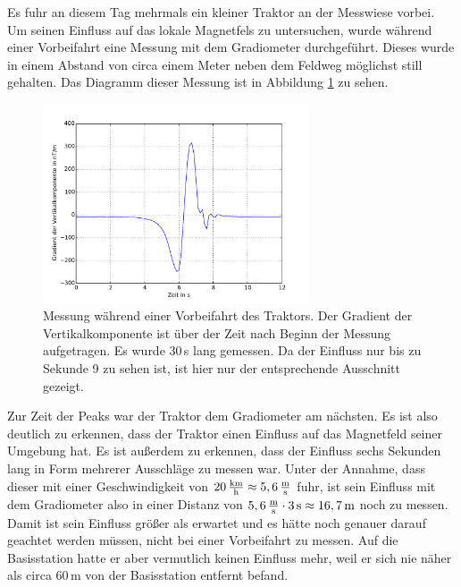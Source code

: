 Es fuhr an diesem Tag mehrmals ein kleiner Traktor an der Messwiese vorbei. Um seinen Einfluss auf das lokale Magnetfels zu untersuchen, wurde während einer Vorbeifahrt eine Messung mit dem Gradiometer durchgeführt. Dieses wurde in einem Abstand von circa einem Meter neben dem Feldweg möglichst still gehalten. Das Diagramm dieser Messung ist in Abbildung \ref{fig:plot_traktor} zu sehen.

\begin{figure}[!ht]
 \centering
 \includegraphics[width=0.7\textwidth]{fig/traktor_ausschnitt.pdf}
 \caption[Messung während einer Vorbeifahrt des Traktors]{Messung während einer Vorbeifahrt des Traktors. Der Gradient der Vertikalkomponente ist über der Zeit nach Beginn der Messung aufgetragen. Es wurde 30\,s lang gemessen. Da der Einfluss nur bis zu Sekunde 9 zu sehen ist, ist hier nur der entsprechende Ausschnitt gezeigt.}
 \label{fig:plot_traktor}
\end{figure}

Zur Zeit der Peaks war der Traktor dem Gradiometer am nächsten. Es ist also deutlich zu erkennen, dass der Traktor einen Einfluss auf das Magnetfeld seiner Umgebung hat. Es ist außerdem zu erkennen, dass der Einfluss sechs Sekunden lang in Form mehrerer Ausschläge zu messen war. Unter der Annahme, dass dieser mit einer Geschwindigkeit von $20\,\frac{\mathrm{km}}{\mathrm{h}}\approx5,6\,\frac{\mathrm{m}}{\mathrm{s}}$ fuhr, ist sein Einfluss mit dem Gradiometer also in einer Distanz von $5,6\,\frac{\mathrm{m}}{\mathrm{s}}\cdot3\,\mathrm{s}\approx16,7\,\mathrm{m}$ noch zu messen. Damit ist sein Einfluss größer als erwartet und es hätte noch genauer darauf geachtet werden müssen, nicht bei einer Vorbeifahrt zu messen. Auf die Basisstation hatte er aber vermutlich keinen Einfluss mehr, weil er sich nie näher als circa 60\,m von der Basisstation entfernt befand.